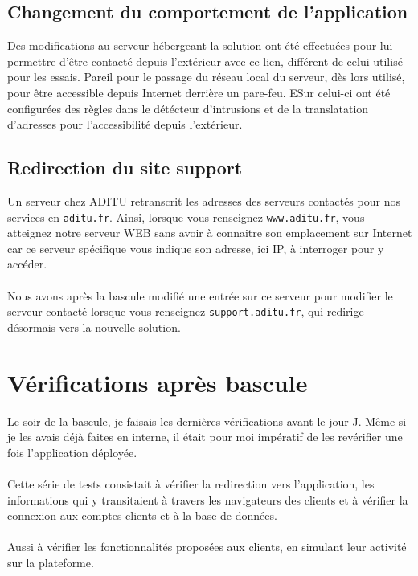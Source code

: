\subsection{Changement du comportement de l'application}

Des modifications au serveur hébergeant la solution ont été effectuées pour lui permettre d'être contacté depuis l'extérieur avec ce lien, différent de celui utilisé pour les essais. Pareil pour le passage du réseau local du serveur, dès lors utilisé, pour être accessible depuis Internet derrière un pare-feu. ESur celui-ci ont été configurées des règles dans le détécteur d'intrusions et de la translatation d'adresses pour l'accessibilité depuis l'extérieur.

\subsection{Redirection du site support}

Un serveur chez ADITU retranscrit les adresses des serveurs contactés pour nos services en \texttt{aditu.fr}. Ainsi, lorsque vous renseignez \texttt{www.aditu.fr}, vous atteignez notre serveur WEB sans avoir à connaitre son emplacement sur Internet car ce serveur spécifique vous indique son adresse, ici IP, à interroger pour y accéder.
\\ \\
Nous avons après la bascule modifié une entrée sur ce serveur pour modifier le serveur contacté lorsque vous renseignez \texttt{support.aditu.fr}, qui redirige désormais vers la nouvelle solution.

\section{Vérifications après bascule}

Le soir de la bascule, je faisais les dernières vérifications avant le jour J. Même si je les avais déjà faites en interne, il était pour moi impératif de les revérifier une fois l'application déployée.
\\ \\
Cette série de tests consistait à vérifier la redirection vers l'application, les informations qui y transitaient à travers les navigateurs des clients et à vérifier la connexion aux comptes clients et à la base de données.
\\ \\
Aussi à vérifier les fonctionnalités proposées aux clients, en simulant leur activité sur la plateforme.

